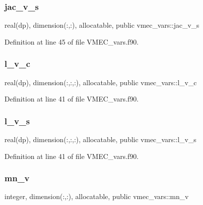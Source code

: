 \subsubsection{\texorpdfstring{jac\+\_\+v\+\_\+s}{jac\_v\_s}}
{\footnotesize\ttfamily real(dp), dimension(\+:,\+:), allocatable, public vmec\+\_\+vars\+::jac\+\_\+v\+\_\+s}



Definition at line 45 of file V\+M\+E\+C\+\_\+vars.\+f90.

\mbox{\label{namespacevmec__vars_acf90dcedfaae39a8a6778fbf75a90a40}} 
\subsubsection{\texorpdfstring{l\+\_\+v\+\_\+c}{l\_v\_c}}
{\footnotesize\ttfamily real(dp), dimension(\+:,\+:,\+:), allocatable, public vmec\+\_\+vars\+::l\+\_\+v\+\_\+c}



Definition at line 41 of file V\+M\+E\+C\+\_\+vars.\+f90.

\mbox{\label{namespacevmec__vars_a5d1de7879021fa8c1d8c10bbef01f9c7}} 
\subsubsection{\texorpdfstring{l\+\_\+v\+\_\+s}{l\_v\_s}}
{\footnotesize\ttfamily real(dp), dimension(\+:,\+:,\+:), allocatable, public vmec\+\_\+vars\+::l\+\_\+v\+\_\+s}



Definition at line 41 of file V\+M\+E\+C\+\_\+vars.\+f90.

\mbox{\label{namespacevmec__vars_a4b9a64bc60d45f2b10e03f624ade3e82}} 
\subsubsection{\texorpdfstring{mn\+\_\+v}{mn\_v}}
{\footnotesize\ttfamily integer, dimension(\+:,\+:), allocatable, public vmec\+\_\+vars\+::mn\+\_\+v}



